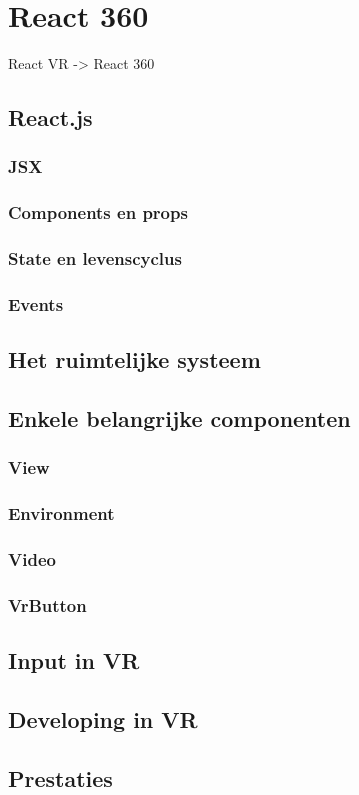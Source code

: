 \chapter{React 360}
\label{ch:react-vr}

React VR -> React 360

\section{React.js}
\label{sec:reactjs}
\subsection{JSX}
\label{subsec:jsx}
\subsection{Components en props}
\label{subsec:components-en-props}
\subsection{State en levenscyclus}
\label{subsec:state-en-levenscyclus}
\subsection{Events}
\label{subsec:events}

\section{Het ruimtelijke systeem}
\label{sec:ruimtelijk-systeem}

\section{Enkele belangrijke componenten}
\label{sec:reactvr-componenten}
\subsection{View}
\label{subsec:view}
\subsection{Environment}
\subsection{Video}
\subsection{VrButton}

\section{Input in VR}
\label{sec:input-vr}

\section{Developing in VR}
\label{sec:developing-vr}

\section{Prestaties}
\label{sec:prestaties}
